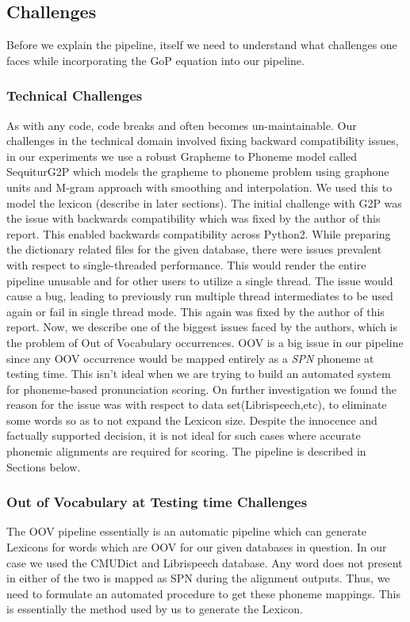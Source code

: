 \documentclass[letterpaper,12pt]{article}
\begin{document}
\subsection{Challenges}
Before we explain the pipeline, itself we need to understand what challenges one faces while 
incorporating the GoP equation into our pipeline.

\subsubsection{Technical Challenges}
As with any code, code breaks and often becomes un-maintainable. Our challenges in the 
technical domain involved fixing backward compatibility issues, in our experiments we use a 
robust Grapheme to Phoneme model called SequiturG2P which models the grapheme to 
phoneme problem using graphone units and M-gram approach with smoothing and 
interpolation. We used this to model the lexicon (describe in later sections). The initial 
challenge with G2P was the issue with backwards compatibility which was fixed by the 
author of this report. This enabled backwards compatibility across Python2.
While preparing the dictionary related files for the given database, there were issues prevalent
with respect to single-threaded performance. This would render the entire pipeline unusable 
and for other users to utilize a single thread. The issue would cause a bug, leading to 
previously run multiple thread intermediates to be used again or fail in single thread mode.
This again was fixed by the author of this report. Now, we describe one of the biggest issues faced by the authors, which is the problem of Out of Vocabulary occurrences. OOV is a big issue in our pipeline since any OOV occurrence would be mapped entirely as a \emph{SPN} phoneme at testing time. This isn’t ideal when we are trying to build an automated system for phoneme-based pronunciation scoring. On further investigation we found the reason for the issue was with respect to data set(Librispeech,etc), to eliminate some words so as to not expand the Lexicon size. Despite the innocence and factually supported decision, it is not ideal for such cases where accurate phonemic alignments are required for scoring. The pipeline is described in Sections below.

\subsubsection{Out of Vocabulary at Testing time Challenges}

The OOV pipeline essentially is an automatic pipeline which can generate Lexicons for words 
which are OOV for our given databases in question. In our case we used the CMUDict and 
Librispeech database. Any word does not present in either of the two is mapped as SPN
during the alignment outputs. Thus, we need to formulate an automated procedure to get these 
phoneme mappings. This is essentially the method used by us to generate the Lexicon. 
\end{document}
